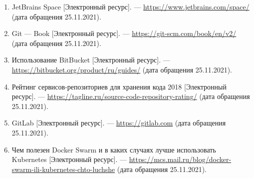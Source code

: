 \begin{enumerate}
    \item JetBrains Space [Электронный ресурс]. — \url{https://www.jetbrains.com/space/} (дата обращения 25.11.2021).
    \item Git --- Book [Электронный ресурс]. — \url{https://git-scm.com/book/en/v2/} (дата обращения 25.11.2021).
    \item Использование BitBucket [Электронный ресурс]. — \url{https://bitbucket.org/product/ru/guides/} (дата обращения 25.11.2021).
    \item Рейтинг сервисов-репозиториев для хранения кода 2018 [Электронный ресурс]. — \url{https://tagline.ru/source-code-repository-rating/} (дата обращения 25.11.2021).
    \item GitLab [Электронный ресурс]. — \url{https://gitlab.com} (дата обращения 25.11.2021).
    \item Чем полезен Docker Swarm и в каких случаях лучше использовать Kubernetes [Электронный ресурс]. — \url{https://mcs.mail.ru/blog/docker-swarm-ili-kubernetes-chto-luchshe} (дата обращения 25.11.2021).
\end{enumerate}